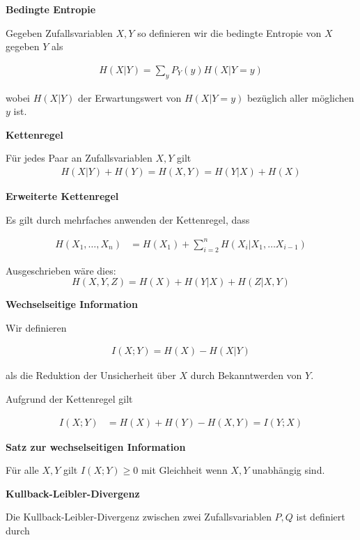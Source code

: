 \documentclass[25pt]{sciposter}
\newenvironment{defn}[1]{\begin{mdframed}[backgroundcolor=blue!10,innertopmargin=15pt, nobreak=true,innerbottommargin=15pt]
		\textbf{#1 }
	}
	{ 
	\end{mdframed}
}
\newenvironment{thm}[1]{\begin{mdframed}[nobreak=true,backgroundcolor=Emerald!10,innertopmargin=15pt, innerbottommargin=15pt]
		\textbf{#1 }
	}
	{ 
	\end{mdframed}
}
\begin{document}
\begin{multicols}{3}
\begin{defn}{Bedingte Entropie}
	Gegeben Zufallsvariablen $X,Y$ so definieren wir die bedingte Entropie von $X$ gegeben $Y$ als
	
	\begin{align*}
		H(X|Y) = \sum_y P_Y(y) H(X|Y=y)
	\end{align*}
	
	wobei $H(X|Y)$ der Erwartungswert von $H(X|Y=y)$ bezüglich aller möglichen $y$ ist.
\end{defn}

\begin{thm}{Kettenregel}
	Für jedes Paar an Zufallsvariablen $X,Y$ gilt
	\begin{align*}
		H(X|Y) + H(Y) = H(X,Y) = H(Y|X) + H(X)
	\end{align*}
\end{thm}

\begin{thm}{Erweiterte Kettenregel}
	Es gilt durch mehrfaches anwenden der Kettenregel, dass
	
	\begin{align*}
		H(X_1,\ldots,X_n) &= H(X_1) + \sum_{i=2}^{n} H(X_i | X_1,\ldots X_{i-1})
	\end{align*}
	
	Ausgeschrieben wäre dies:
	$$H(X,Y,Z) = H(X) + H(Y|X) + H(Z|X,Y)$$
\end{thm}


\begin{defn}{Wechselseitige Information}
	Wir definieren 
	
	\begin{align*}
		I(X;Y) = H(X) - H(X|Y)
	\end{align*}
	
	als die Reduktion der Unsicherheit über $X$ durch Bekanntwerden von $Y$.
	
	Aufgrund der Kettenregel gilt
	
	\begin{align*}
		I(X;Y) &= H(X) + H(Y) - H(X,Y) = I(Y;X)
	\end{align*}
	
\end{defn}


	\begin{thm}{Satz zur wechselseitigen Information}
	Für alle $X,Y$ gilt $I(X;Y)\geq 0$ mit Gleichheit wenn $X,Y$ unabhängig sind.	
\end{thm}


\begin{defn}{Kullback-Leibler-Divergenz}
	Die Kullback-Leibler-Divergenz zwischen zwei Zufallsvariablen $P,Q$ ist definiert durch
	

\end{defn}
\end{multicols}
\end{document}

